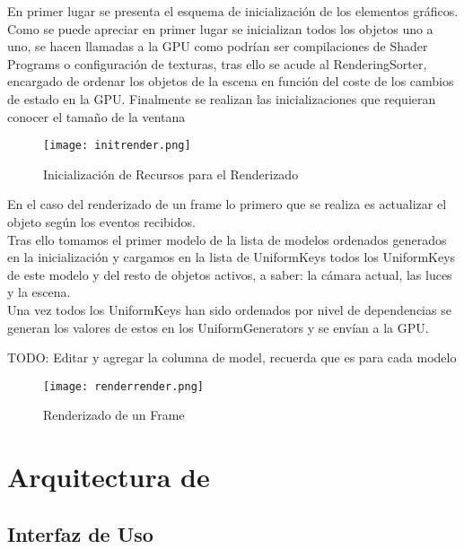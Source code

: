 En primer lugar se presenta el esquema de inicialización de los elementos gráficos.\\
Como se puede apreciar en primer lugar se inicializan todos los objetos uno a uno, se hacen llamadas a la GPU como podrían ser compilaciones de Shader Programs o configuración de texturas,
tras ello se acude al RenderingSorter, encargado de ordenar los objetos de la escena en función del coste de los cambios de estado en la GPU.
Finalmente se realizan las inicializaciones que requieran conocer el tamaño de la ventana 

\begin{figure}[h!]
\begin{center}
\texttt{[image: initrender.png]}
\end{center}
\caption[Inicialización de Recursos para el Renderizado]{Inicialización de Recursos para el Renderizado}
\label{fig:initrender}
\end{figure}

En el caso del renderizado de un frame lo primero que se realiza es actualizar el objeto según los eventos recibidos.\\
Tras ello tomamos el primer modelo de la lista de modelos ordenados generados en la inicialización y cargamos en la lista de UniformKeys todos los UniformKeys de este modelo y del resto de objetos activos, a saber: la cámara actual, las luces y la escena.\\
Una vez todos los UniformKeys han sido ordenados por nivel de dependencias se generan los valores de estos en los UniformGenerators y se envían a la GPU.

TODO: Editar y agregar la columna de model, recuerda que es para cada modelo
\begin{figure}[h!]
\begin{center}
\texttt{[image: renderrender.png]}
\end{center}
\caption[Renderizado de un Frame]{Renderizado de un Frame}
\label{fig:renderrender}
\end{figure}




\section{Arquitectura de \robotto}

\subsection{Interfaz de Uso}

